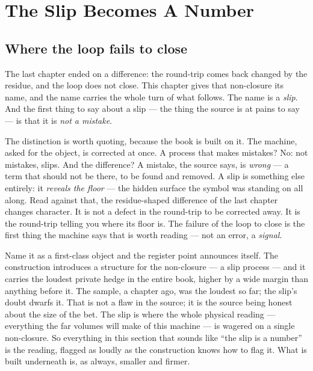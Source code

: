 \chapter{The Slip Becomes A Number}

\section{Where the loop fails to close}

The last chapter ended on a difference: the round-trip comes back changed by the residue, and the loop does not close.
This chapter gives that non-closure its name, and the name carries the whole turn of what follows. The name is a
\emph{slip}. And the first thing to say about a slip --- the thing the source is at pains to say --- is that it is
\emph{not a mistake}.

The distinction is worth quoting, because the book is built on it. The machine, asked for the object, is corrected at
once. A process that makes mistakes? No: not mistakes, slips. And the difference? A mistake, the source says, is
\emph{wrong} --- a term that should not be there, to be found and removed. A slip is something else entirely: it
\emph{reveals the floor} --- the hidden surface the symbol was standing on all along. Read against that, the
residue-shaped difference of the last chapter changes character. It is not a defect in the round-trip to be corrected
away. It is the round-trip telling you where its floor is. The failure of the loop to close is the first thing the
machine says that is worth reading --- not an error, a \emph{signal}.

Name it as a first-class object and the register point announces itself. The construction introduces a structure for
the non-closure --- a slip process --- and it carries the loudest private hedge in the entire book, higher by a wide
margin than anything before it. The sample, a chapter ago, was the loudest so far; the slip's doubt dwarfs it. That is
not a flaw in the source; it is the source being honest about the size of the bet. The slip is where the whole physical
reading --- everything the far volumes will make of this machine --- is wagered on a single non-closure. So everything
in this section that sounds like ``the slip is a number'' is the reading, flagged as loudly as the construction knows
how to flag it. What is built underneath is, as always, smaller and firmer.

